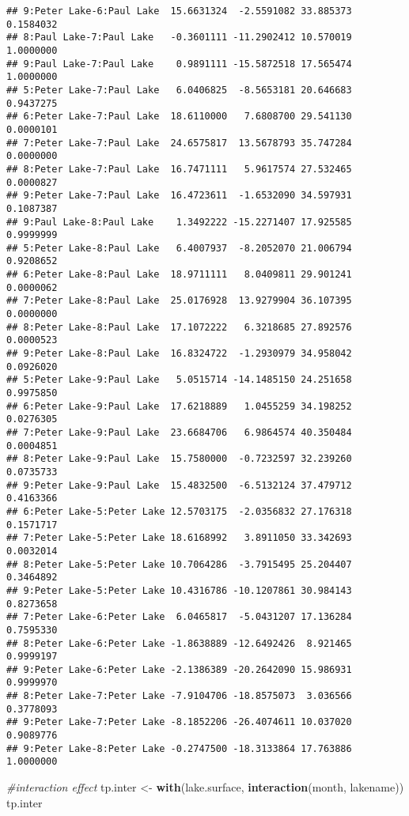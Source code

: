 \documentclass[]{article}
\newenvironment{Shaded}{\begin{snugshade}}{\end{snugshade}}
\newcommand{\CommentTok}[1]{\textcolor[rgb]{0.56,0.35,0.01}{\textit{#1}}}
\newcommand{\KeywordTok}[1]{\textcolor[rgb]{0.13,0.29,0.53}{\textbf{#1}}}
\newcommand{\NormalTok}[1]{#1}
\newcommand{\StringTok}[1]{\textcolor[rgb]{0.31,0.60,0.02}{#1}}
\begin{document}
\begin{verbatim}
## 9:Peter Lake-6:Paul Lake  15.6631324  -2.5591082 33.885373 0.1584032
## 8:Paul Lake-7:Paul Lake   -0.3601111 -11.2902412 10.570019 1.0000000
## 9:Paul Lake-7:Paul Lake    0.9891111 -15.5872518 17.565474 1.0000000
## 5:Peter Lake-7:Paul Lake   6.0406825  -8.5653181 20.646683 0.9437275
## 6:Peter Lake-7:Paul Lake  18.6110000   7.6808700 29.541130 0.0000101
## 7:Peter Lake-7:Paul Lake  24.6575817  13.5678793 35.747284 0.0000000
## 8:Peter Lake-7:Paul Lake  16.7471111   5.9617574 27.532465 0.0000827
## 9:Peter Lake-7:Paul Lake  16.4723611  -1.6532090 34.597931 0.1087387
## 9:Paul Lake-8:Paul Lake    1.3492222 -15.2271407 17.925585 0.9999999
## 5:Peter Lake-8:Paul Lake   6.4007937  -8.2052070 21.006794 0.9208652
## 6:Peter Lake-8:Paul Lake  18.9711111   8.0409811 29.901241 0.0000062
## 7:Peter Lake-8:Paul Lake  25.0176928  13.9279904 36.107395 0.0000000
## 8:Peter Lake-8:Paul Lake  17.1072222   6.3218685 27.892576 0.0000523
## 9:Peter Lake-8:Paul Lake  16.8324722  -1.2930979 34.958042 0.0926020
## 5:Peter Lake-9:Paul Lake   5.0515714 -14.1485150 24.251658 0.9975850
## 6:Peter Lake-9:Paul Lake  17.6218889   1.0455259 34.198252 0.0276305
## 7:Peter Lake-9:Paul Lake  23.6684706   6.9864574 40.350484 0.0004851
## 8:Peter Lake-9:Paul Lake  15.7580000  -0.7232597 32.239260 0.0735733
## 9:Peter Lake-9:Paul Lake  15.4832500  -6.5132124 37.479712 0.4163366
## 6:Peter Lake-5:Peter Lake 12.5703175  -2.0356832 27.176318 0.1571717
## 7:Peter Lake-5:Peter Lake 18.6168992   3.8911050 33.342693 0.0032014
## 8:Peter Lake-5:Peter Lake 10.7064286  -3.7915495 25.204407 0.3464892
## 9:Peter Lake-5:Peter Lake 10.4316786 -10.1207861 30.984143 0.8273658
## 7:Peter Lake-6:Peter Lake  6.0465817  -5.0431207 17.136284 0.7595330
## 8:Peter Lake-6:Peter Lake -1.8638889 -12.6492426  8.921465 0.9999197
## 9:Peter Lake-6:Peter Lake -2.1386389 -20.2642090 15.986931 0.9999970
## 8:Peter Lake-7:Peter Lake -7.9104706 -18.8575073  3.036566 0.3778093
## 9:Peter Lake-7:Peter Lake -8.1852206 -26.4074611 10.037020 0.9089776
## 9:Peter Lake-8:Peter Lake -0.2747500 -18.3133864 17.763886 1.0000000
\end{verbatim}

\begin{Shaded}
\begin{Highlighting}[]
\CommentTok{#interaction effect}
\NormalTok{tp.inter <-}\StringTok{ }\KeywordTok{with}\NormalTok{(lake.surface, }\KeywordTok{interaction}\NormalTok{(month, lakename))}
\NormalTok{tp.inter}
\end{Highlighting}
\end{Shaded}
\end{document}
